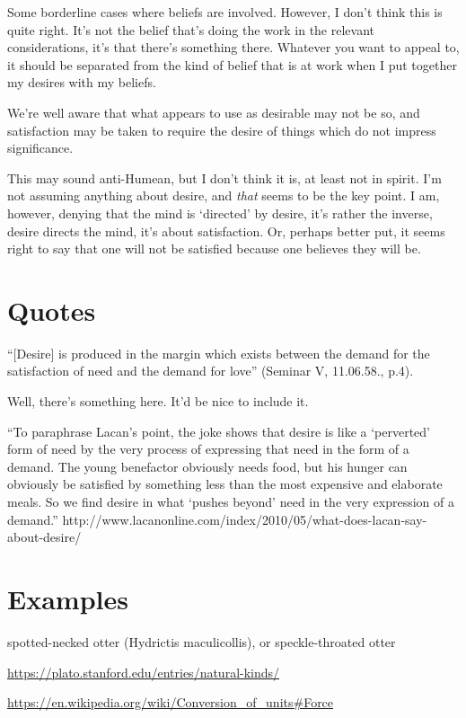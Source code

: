\documentclass[10pt]{article}
\begin{document}
Some borderline cases where beliefs are involved.
However, I don't think this is quite right.
It's not the belief that's doing the work in the relevant considerations, it's that there's something there.
Whatever you want to appeal to, it should be separated from the kind of belief that is at work when I put together my desires with my beliefs.

We're well aware that what appears to use as desirable may not be so, and satisfaction may be taken to require the desire of things which do not impress significance.

This may sound anti-Humean, but I don't think it is, at least not in spirit.
I'm not assuming anything about desire, and \emph{that} seems to be the key point.
I am, however, denying that the mind is `directed' by desire, it's rather the inverse, desire directs the mind, it's about satisfaction.
Or, perhaps better put, it seems right to say that one will not be satisfied because one believes they will be.


\section{Quotes}
\label{sec:quotes}

“[Desire] is produced in the margin which exists between the demand for the satisfaction of need and the demand for love” (Seminar V, 11.06.58., p.4).

Well, there's something here.
It'd be nice to include it.

``To paraphrase Lacan’s point, the joke shows that desire is like a ‘perverted’ form of need by the very process of expressing that need in the form of a demand. The young benefactor obviously needs food, but his hunger can obviously be satisfied by something less than the most expensive and elaborate meals. So we find desire in what ‘pushes beyond’ need in the very expression of a demand.''
http://www.lacanonline.com/index/2010/05/what-does-lacan-say-about-desire/

\section{Examples}
\label{sec:examples}

spotted-necked otter (Hydrictis maculicollis), or speckle-throated otter

\url{https://plato.stanford.edu/entries/natural-kinds/}

\url{https://en.wikipedia.org/wiki/Conversion_of_units#Force}
\end{document}
